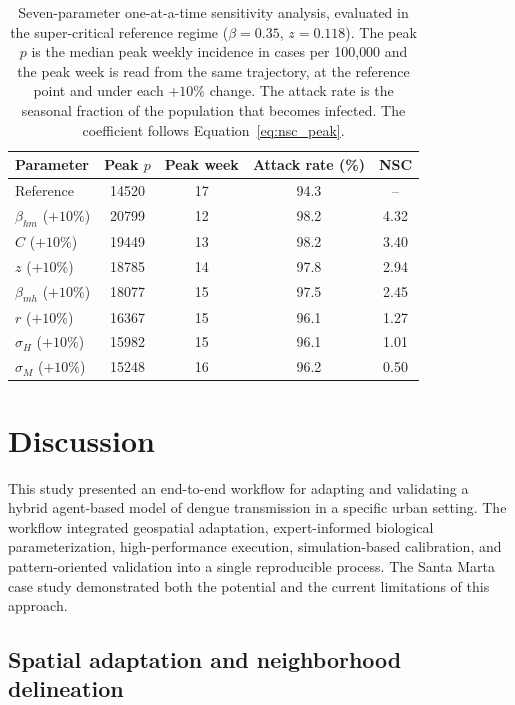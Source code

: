 \documentclass[applsci,article,accept,pdftex,moreauthors]{Definitions/mdpi}
\begin{document}
\begin{table}[H]
\centering
\caption{Seven-parameter one-at-a-time sensitivity analysis, evaluated in the super-critical reference regime ($\beta=0.35$, $z=0.118$). The peak $p$ is the median peak weekly incidence in cases per 100{,}000 and the peak week is read from the same trajectory, at the reference point and under each $+10\%$ change. The attack rate is the seasonal fraction of the population that becomes infected. The coefficient follows Equation~\eqref{eq:nsc_peak}.}
\label{table:sensitivity}
\begin{tabular}{lcccc}
\toprule
\textbf{Parameter} & \textbf{Peak} $p$ & \textbf{Peak week} & \textbf{Attack rate (\%)} & \textbf{NSC} \\
\midrule
Reference              & 14520 & 17 & 94.3 & --   \\
$\beta_{hm}$ ($+10\%$) & 20799 & 12 & 98.2 & 4.32 \\
$C$ ($+10\%$)          & 19449 & 13 & 98.2 & 3.40 \\
$z$ ($+10\%$)          & 18785 & 14 & 97.8 & 2.94 \\
$\beta_{mh}$ ($+10\%$) & 18077 & 15 & 97.5 & 2.45 \\
$r$ ($+10\%$)          & 16367 & 15 & 96.1 & 1.27 \\
$\sigma_H$ ($+10\%$)   & 15982 & 15 & 96.1 & 1.01 \\
$\sigma_M$ ($+10\%$)   & 15248 & 16 & 96.2 & 0.50 \\
\bottomrule
\end{tabular}
\end{table}

\section{Discussion}
\label{sec:discussion}

This study presented an end-to-end workflow for adapting and validating a hybrid agent-based model of dengue transmission in a specific urban setting. The workflow integrated geospatial adaptation, expert-informed biological parameterization, high-performance execution, simulation-based calibration, and pattern-oriented validation into a single reproducible process. The Santa Marta case study demonstrated both the potential and the current limitations of this approach.

\subsection{Spatial adaptation and neighborhood delineation}
\end{document}
